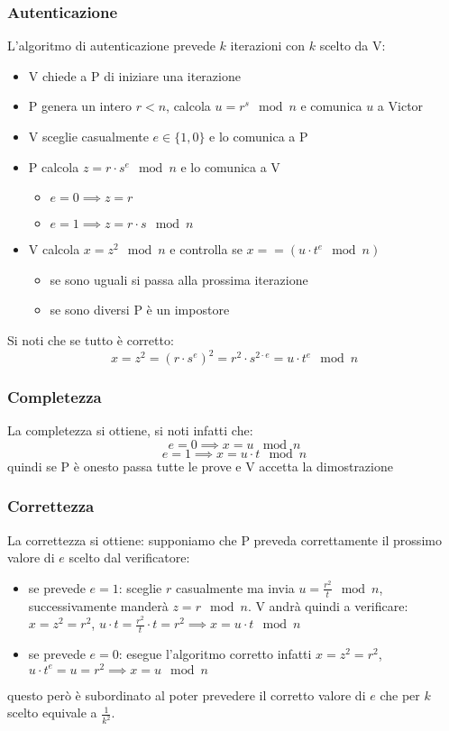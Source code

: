 \subsubsection{Autenticazione}
L'algoritmo di autenticazione prevede $k$ iterazioni con $k$ scelto da V:
\begin{itemize}
    \item V chiede a P di iniziare una iterazione
    \item P genera un intero $r < n$, calcola $u = r^s \mod n$ e comunica $u$ a Victor
    \item V sceglie casualmente $e \in \{1, 0\}$ e lo comunica a P
    \item P calcola $z = r \cdot s^e \mod n$ e lo comunica a V
    \begin{itemize}
        \item $e = 0 \implies z = r$
        \item $e = 1 \implies z = r \cdot s \mod n$
    \end{itemize}
    \item V calcola $x = z^2 \mod n$ e controlla se $x == (u \cdot t^e \mod n)$
    \begin{itemize}
        \item se sono uguali si passa alla prossima iterazione
        \item se sono diversi P è un impostore
    \end{itemize}
\end{itemize}

Si noti che se tutto è corretto:
$$
    x = z^2 = (r \cdot s^e)^2 = r^2 \cdot s^{2 \cdot e} = u \cdot t^{e} \mod n
$$

\subsubsection{Completezza}
La completezza si ottiene, si noti infatti che:
$$ e = 0 \implies x = u \mod n $$
$$ e = 1 \implies x = u \cdot t \mod n $$
quindi se P è onesto passa tutte le prove e V accetta la dimostrazione

\subsubsection{Correttezza}
La correttezza si ottiene: supponiamo che P preveda correttamente il prossimo valore di $e$ scelto dal verificatore:
\begin{itemize}
    \item se prevede $e = 1$: sceglie $r$ casualmente ma invia $u = \frac{r^2}{t} \mod n$, successivamente manderà $z = r \mod n$. V andrà quindi a verificare: $x = z^2 = r^2$, $u \cdot t = \frac{r^2}{t} \cdot t = r^2 \implies x = u \cdot t \mod n$
    \item se prevede $e = 0$: esegue l'algoritmo corretto infatti $x = z^2 = r^2$, $u \cdot t^e = u = r^2 \implies x = u \mod n$
\end{itemize}
questo però è subordinato al poter prevedere il corretto valore di $e$ che per $k$ scelto equivale a $\frac{1}{k^2}$.

